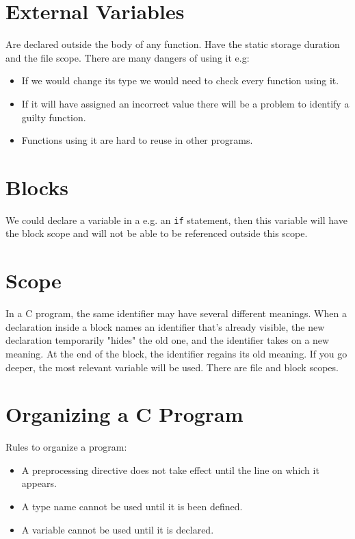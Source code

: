 \documentclass[openany]{book}
\begin{document}
    \section{External Variables}
    Are declared outside the body of any function. Have the static storage duration and the file
    scope. There are many dangers of using it e.g:
    \begin{itemize}
        \item If we would change its type we would need to check every function using it.
        \item If it will have assigned an incorrect value there will be a problem to identify a guilty
        function.
        \item Functions using it are hard to reuse in other programs.
    \end{itemize}
    
    \section{Blocks}
    We could declare a variable in a e.g. an \texttt{if} statement, then this variable will have
    the block scope and will not be able to be referenced outside this scope.
    
    \section{Scope}
    In a C program, the same identifier may have several different meanings. When a declaration inside
    a block names an identifier that's already visible, the new declaration temporarily "hides" the old
    one, and the identifier takes on a new meaning. At the end of the block, the identifier regains its
    old meaning. If you go deeper, the most relevant variable will be used. There are file and block
    scopes.
    
    \section{Organizing a C Program}
    Rules to organize a program:
    \begin{itemize}
        \item A preprocessing directive does not take effect until the line on which it appears.
        \item A type name cannot be used until it is been defined.
        \item A variable cannot be used until it is declared.
    \end{itemize}
\end{document}
